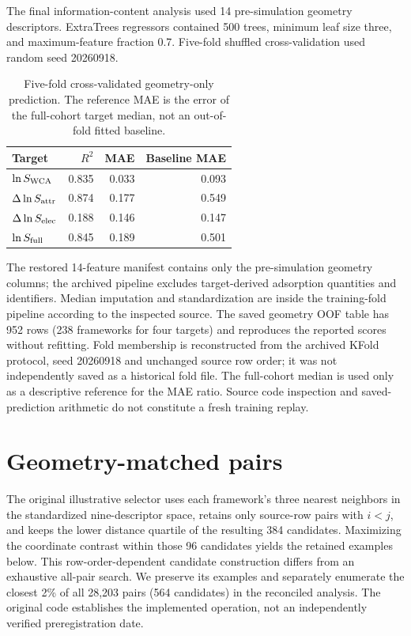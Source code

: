 \documentclass[11pt,a4paper]{article}
\begin{document}
The final information-content analysis used 14 pre-simulation geometry descriptors. ExtraTrees regressors contained 500 trees, minimum leaf size three, and maximum-feature fraction 0.7. Five-fold shuffled cross-validation used random seed 20260918.

\begin{table}[H]
\centering
\caption{Five-fold cross-validated geometry-only prediction. The reference MAE is the error of the full-cohort target median, not an out-of-fold fitted baseline.}
\begin{tabular}{lrrr}
\toprule
Target & $R^2$ & MAE & Baseline MAE\\
\midrule
$\ln S_{\rm WCA}$ & 0.835 & 0.033 & 0.093\\
$\Delta\ln S_{\rm attr}$ & 0.874 & 0.177 & 0.549\\
$\Delta\ln S_{\rm elec}$ & 0.188 & 0.146 & 0.147\\
$\ln S_{\rm full}$ & 0.845 & 0.189 & 0.501\\
\bottomrule
\end{tabular}
\end{table}

The restored 14-feature manifest contains only the pre-simulation geometry columns; the archived pipeline excludes target-derived adsorption quantities and identifiers. Median imputation and standardization are inside the training-fold pipeline according to the inspected source. The saved geometry OOF table has 952 rows (238 frameworks for four targets) and reproduces the reported scores without refitting. Fold membership is reconstructed from the archived KFold protocol, seed 20260918 and unchanged source row order; it was not independently saved as a historical fold file. The full-cohort median is used only as a descriptive reference for the MAE ratio. Source code inspection and saved-prediction arithmetic do not constitute a fresh training replay.

\section{Geometry-matched pairs}

The original illustrative selector uses each framework's three nearest neighbors in the standardized nine-descriptor space, retains only source-row pairs with $i<j$, and keeps the lower distance quartile of the resulting 384 candidates. Maximizing the coordinate contrast within those 96 candidates yields the retained examples below. This row-order-dependent candidate construction differs from an exhaustive all-pair search. We preserve its examples and separately enumerate the closest 2\% of all 28,203 pairs (564 candidates) in the reconciled analysis. The original code establishes the implemented operation, not an independently verified preregistration date.
\end{document}

